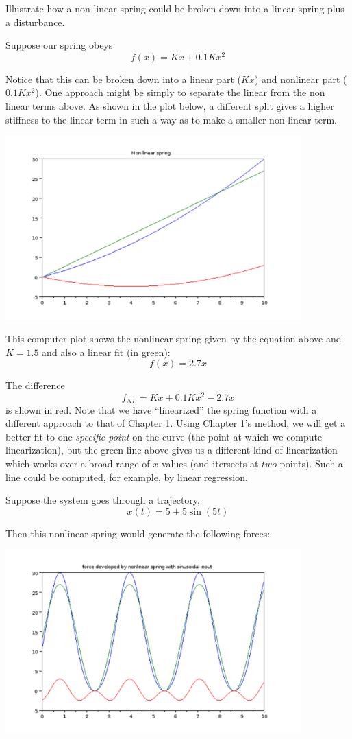 \begin{Example}
Illustrate  how a non-linear spring could be broken down into a linear spring plus a disturbance.

Suppose our spring obeys
\[
f(x) = Kx + 0.1Kx^2
\]

Notice that this can be broken down into a linear part ($Kx$) and nonlinear part ($0.1Kx^2$).  One approach might be simply to separate the linear from the non linear terms above.  As shown in the plot below, a different split gives a higher stiffness to the linear term in such a way as to make a smaller non-linear term.

\includegraphics[width=4.5in]{figs06/nlspringa.png}



This computer plot shows the nonlinear spring given by the equation above and $K=1.5$ and also
a linear fit (in green):
\[
f(x) = 2.7x
\]

The difference
\[
f_{NL} = Kx + 0.1Kx^2 - 2.7x
\]
is shown in red. Note that we have ``linearized'' the spring function with a different approach to that of Chapter 1.   Using Chapter 1's method, we will get a better fit to one {\it specific point} on the curve (the point at which we compute linearization), but the green line above gives us a different kind of linearization which works over a broad range of $x$ values (and itersects at $two$ points).  Such a line could be computed, for example, by linear regression.



Suppose the system goes through a trajectory,
\[
x(t) = 5+5\sin(5t)
\]

Then this nonlinear spring would generate the following forces:

\includegraphics[width=4.5in]{figs06/fsinnlspringa.png}


\end{Example}
